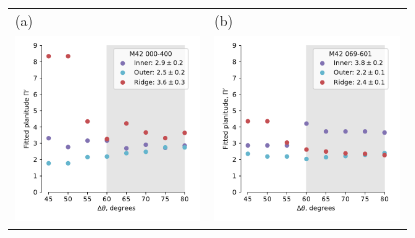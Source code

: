 \begin{figure}
  \begin{tabular}{p{0.47\linewidth} p{0.47\linewidth}}
    (a) & (b) \\
    \includegraphics[width=\linewidth]{figs/000-400-Pi-vs-Dtheta}
    & \includegraphics[width=\linewidth]{figs/069-601-Pi-vs-Dtheta}

\end{tabular}
\end{figure}
